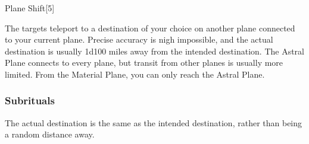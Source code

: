 \begin{spellsection}{Plane Shift}[5]

\begin{spellcontent}

\begin{spelltargetinginfo}



\end{spelltargetinginfo}


\begin{spelleffects}



\spelleffect
The targets teleport to a destination of your choice on another plane connected to your current plane.
Precise accuracy is nigh impossible, and the actual destination is usually 1d100 miles away from the intended destination.
The Astral Plane connects to every plane, but transit from other planes is usually more limited. From the Material Plane, you can only reach the Astral Plane.








\end{spelleffects}

\end{spellcontent}
\begin{spellfooter}


\end{spellfooter}
\begin{spellsubcontent}


\end{spellsubcontent}
\end{spellsection}


\subsubsection{Subrituals}



The actual destination is the same as the intended destination, rather than being a random distance away.






